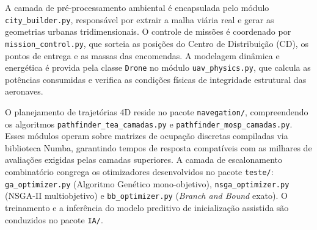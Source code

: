 A camada de pré-processamento ambiental é encapsulada pelo módulo \texttt{city\_builder.py}, responsável por extrair a malha viária real e gerar as geometrias urbanas tridimensionais. O controle de missões é coordenado por \texttt{mission\_control.py}, que sorteia as posições do Centro de Distribuição (CD), os pontos de entrega e as massas das encomendas. A modelagem dinâmica e energética é provida pela classe \texttt{Drone} no módulo \texttt{uav\_physics.py}, que calcula as potências consumidas e verifica as condições físicas de integridade estrutural das aeronaves.

O planejamento de trajetórias 4D reside no pacote \texttt{navegation/}, compreendendo os algoritmos \texttt{pathfinder\_tea\_camadas.py} e \texttt{pathfinder\_mosp\_camadas.py}. Esses módulos operam sobre matrizes de ocupação discretas compiladas via biblioteca Numba, garantindo tempos de resposta compatíveis com as milhares de avaliações exigidas pelas camadas superiores. A camada de escalonamento combinatório congrega os otimizadores desenvolvidos no pacote \texttt{teste/}: \texttt{ga\_optimizer.py} (Algoritmo Genético mono-objetivo), \texttt{nsga\_optimizer.py} (NSGA-II multiobjetivo) e \texttt{bb\_optimizer.py} (\textit{Branch and Bound} exato). O treinamento e a inferência do modelo preditivo de inicialização assistida são conduzidos no pacote \texttt{IA/}.

